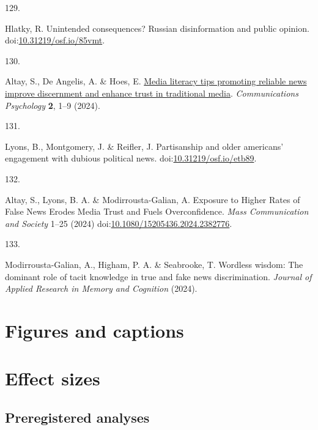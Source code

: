 \documentclass[
  man]{apa6}
\newlength{\cslhangindent}
\newlength{\csllabelwidth}
\newenvironment{CSLReferences}[2] %
 {\begin{list}{}{%
  \setlength{\itemindent}{0pt}
  \setlength{\leftmargin}{0pt}
  \setlength{\parsep}{0pt}
  \ifodd #1
   \setlength{\leftmargin}{\cslhangindent}
   \setlength{\itemindent}{-1\cslhangindent}
  \fi
  \setlength{\itemsep}{#2\baselineskip}}}
 {\end{list}}
\newcommand{\CSLLeftMargin}[1]{\parbox[t]{\csllabelwidth}{\strut#1\strut}}
\newcommand{\CSLRightInline}[1]{\parbox[t]{\linewidth - \csllabelwidth}{\strut#1\strut}}
\begin{document}
\begin{CSLReferences}{0}{0}
\CSLLeftMargin{129. }%
\CSLRightInline{*Hlatky, R. Unintended consequences? Russian disinformation and public opinion. doi:\href{https://doi.org/10.31219/osf.io/85vmt}{10.31219/osf.io/85vmt}.}

\CSLLeftMargin{130. }%
\CSLRightInline{*Altay, S., De Angelis, A. \& Hoes, E. \href{https://doi.org/10.1038/s44271-024-00121-5}{Media literacy tips promoting reliable news improve discernment and enhance trust in traditional media}. \emph{Communications Psychology} \textbf{2}, 1--9 (2024).}

\CSLLeftMargin{131. }%
\CSLRightInline{*Lyons, B., Montgomery, J. \& Reifler, J. Partisanship and older americans{'} engagement with dubious political news. doi:\href{https://doi.org/10.31219/osf.io/etb89}{10.31219/osf.io/etb89}.}

\CSLLeftMargin{132. }%
\CSLRightInline{*Altay, S., Lyons, B. A. \& Modirrousta-Galian, A. Exposure to Higher Rates of False News Erodes Media Trust and Fuels Overconfidence. \emph{Mass Communication and Society} 1--25 (2024) doi:\href{https://doi.org/10.1080/15205436.2024.2382776}{10.1080/15205436.2024.2382776}.}

\CSLLeftMargin{133. }%
\CSLRightInline{*Modirrousta-Galian, A., Higham, P. A. \& Seabrooke, T. Wordless wisdom: The dominant role of tacit knowledge in true and fake news discrimination. \emph{Journal of Applied Research in Memory and Cognition} (2024).}

\end{CSLReferences}

\endgroup
\newpage

\section{Figures and captions}\label{figures-and-captions}

\newpage

\appendix


\section{Effect sizes}\label{effect-sizes}

\subsection{Preregistered analyses}\label{preregistered-analyses}
\end{document}
